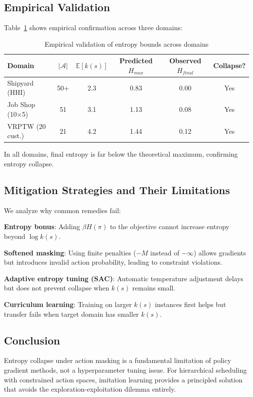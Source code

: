 \subsection{Empirical Validation}

Table~\ref{tab:entropy_theory_validation} shows empirical confirmation across three domains:

\begin{table}[h]
\centering
\caption{Empirical validation of entropy bounds across domains}
\label{tab:entropy_theory_validation}
\begin{tabular}{lccccc}
\toprule
Domain & $|\mathcal{A}|$ & $\mathbb{E}[k(s)]$ & Predicted $H_{max}$ & Observed $H_{final}$ & Collapse? \\
\midrule
Shipyard (HHI) & 50+ & 2.3 & 0.83 & 0.00 & Yes \\
Job Shop (10×5) & 51 & 3.1 & 1.13 & 0.08 & Yes \\
VRPTW (20 cust.) & 21 & 4.2 & 1.44 & 0.12 & Yes \\
\bottomrule
\end{tabular}
\end{table}

In all domains, final entropy is far below the theoretical maximum, confirming entropy collapse.

\subsection{Mitigation Strategies and Their Limitations}

We analyze why common remedies fail:

\textbf{Entropy bonus}: Adding $\beta H(\pi)$ to the objective cannot increase entropy beyond $\log k(s)$.

\textbf{Softened masking}: Using finite penalties ($-M$ instead of $-\infty$) allows gradients but introduces invalid action probability, leading to constraint violations.

\textbf{Adaptive entropy tuning (SAC)}: Automatic temperature adjustment delays but does not prevent collapse when $k(s)$ remains small.

\textbf{Curriculum learning}: Training on larger $k(s)$ instances first helps but transfer fails when target domain has smaller $k(s)$.

\subsection{Conclusion}

Entropy collapse under action masking is a fundamental limitation of policy gradient methods, not a hyperparameter tuning issue. For hierarchical scheduling with constrained action spaces, imitation learning provides a principled solution that avoids the exploration-exploitation dilemma entirely.
